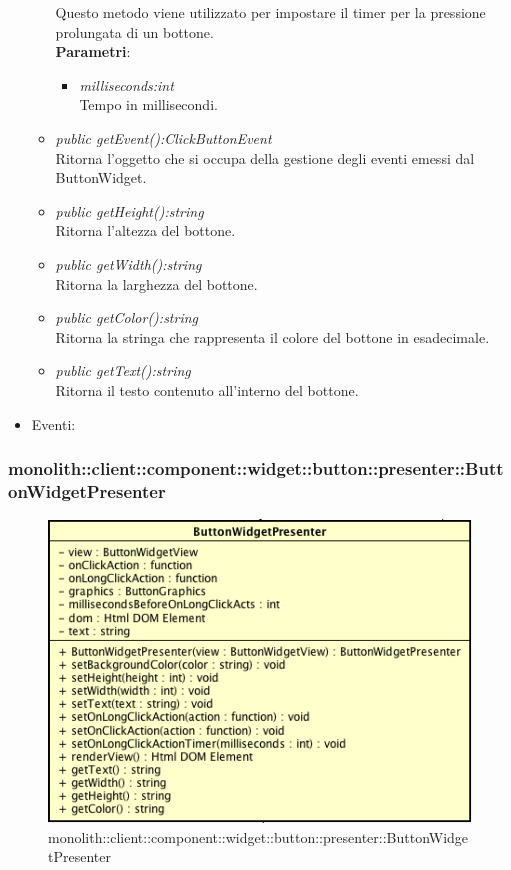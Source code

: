 \begin{itemize}
\begin{itemize}
		Questo metodo viene utilizzato per impostare il timer per la pressione prolungata di un bottone.
				\\ \textbf{Parametri}: \begin{itemize}
				\item \textit{milliseconds:int}\\
				Tempo in millisecondi.
	\end{itemize}
	\item \textit{public getEvent():ClickButtonEvent}\\
	Ritorna l'oggetto che si occupa della gestione degli eventi emessi dal ButtonWidget.
	\item \textit{public getHeight():string}\\
	Ritorna l'altezza del bottone.
	\item \textit{public getWidth():string}\\
	Ritorna la larghezza del bottone.
	\item \textit{public getColor():string}\\
	Ritorna la stringa che rappresenta il colore del bottone in esadecimale.
	\item \textit{public getText():string}\\
	Ritorna il testo contenuto all'interno del bottone.
	\end{itemize}
\item{Eventi}:
\end{itemize}

\subsubsection{monolith::client::component::widget::button::presenter::ButtonWidgetPresenter}

\label{monolith::client::component::widget::button::presenter::ButtonWidgetPresenter}
\begin{figure}[H]
	\centering
	\includegraphics[scale=0.5]{Sezioni/SottosezioniST/img/ButtonWidgetPresenter.png}
	\caption{monolith::client::component::widget::button::presenter::ButtonWidgetPresenter}
\end{figure}


